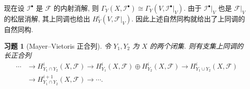 \documentclass{article}
\theoremstyle{exercise}
\newtheorem{exercise}{习题}[section]
\theoremstyle{plain}
\theoremstyle{remark}
\newenvironment{proofc}{\proof}{\endproof}
\def\cF{\mathscr{F}}
\def\cI{\mathscr{I}}
\begin{document}
\begin{proofc}
\begin{enumerate}[label=(\arabic*)]
          现在设 $\cI^\bullet$ 是 $\cF$ 的内射消解,
          则 $\Gamma_Y(X, \cI^\bullet) \cong \Gamma_Y(V, \cI^\bullet|_V)$.
          由于 $\cI^\bullet|_V$ 也是 $\cF|_V$ 的松层消解,
          其上同调也给出 $H_Y^i(V, \cF|_V)$. 因此上述自然同构就给出了上同调的自然同构.
          \qedhere
  \end{enumerate}
\end{proofc}

\begin{exercise}[Mayer--Vietoris 正合列]
  令 $Y_1, Y_2$ 为 $X$ 的两个闭集. 则有支集上同调的长正合列
  \begin{align*}
    \cdots & \to H^i_{Y_1 \cap Y_2}(X, \cF)
              \to H^i_{Y_1}(X, \cF) \oplus H^i_{Y_2}(X, \cF)
              \to H^i_{Y_1 \cup Y_2}(X, \cF) \\
            & \to H^{i+1}_{Y_1 \cap Y_2}(X, \cF) \to \cdots.
  \end{align*}
\end{exercise}
\end{document}
